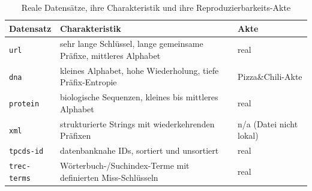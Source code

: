 \begin{table}[!htbp]
  \centering\small
  \caption{Reale Datensätze, ihre Charakteristik und ihre Reproduzierbarkeits-Akte}\label{tab:datasets}
  \begin{tabular}{lll}
    \toprule
    \textbf{Datensatz} & \textbf{Charakteristik} & \textbf{Akte} \\
    \midrule
    \texttt{url} & sehr lange Schlüssel, lange gemeinsame Präfixe, mittleres Alphabet & real \\
    \texttt{dna} & kleines Alphabet, hohe Wiederholung, tiefe Präfix-Entropie & Pizza\&Chili-Akte \\
    \texttt{protein} & biologische Sequenzen, kleines bis mittleres Alphabet & real \\
    \texttt{xml} & strukturierte Strings mit wiederkehrenden Präfixen & n/a (Datei nicht lokal) \\
    \texttt{tpcds-id} & datenbanknahe IDs, sortiert und unsortiert & real \\
    \texttt{trec-terms} & Wörterbuch-/Suchindex-Terme mit definierten Miss-Schlüsseln & real \\
    \bottomrule
  \end{tabular}
\end{table}

